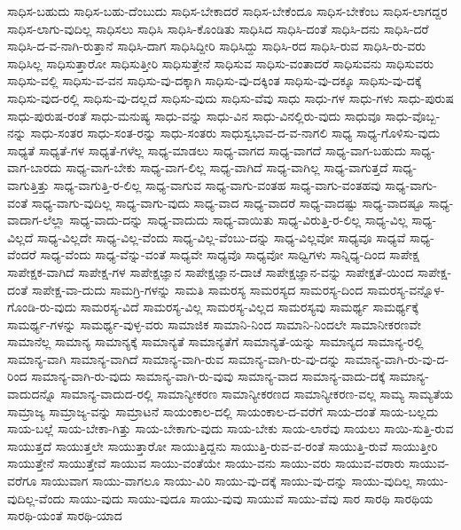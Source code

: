 {ಸಾಧಿಸ-ಬಹುದು
ಸಾಧಿಸ-ಬಹು-ದೆಂಬುದು
ಸಾಧಿಸ-ಬೇಕಾದರೆ
ಸಾಧಿಸ-ಬೇಕೆಂದೂ
ಸಾಧಿಸ-ಬೇಕೆಂಬ
ಸಾಧಿಸ-ಲಾಗದ್ದರ
ಸಾಧಿಸ-ಲಾಗು-ವುದಿಲ್ಲ
ಸಾಧಿಸಲು
ಸಾಧಿಸಿ
ಸಾಧಿಸಿ-ಕೊಂಡಿತು
ಸಾಧಿಸಿದ
ಸಾಧಿಸಿ-ದಂತೆ
ಸಾಧಿಸಿ-ದನು
ಸಾಧಿಸಿ-ದರೆ
ಸಾಧಿಸಿ-ದ-ವ-ನಾಗಿ-ರುತ್ತಾನೆ
ಸಾಧಿಸಿ-ದಾಗ
ಸಾಧಿಸಿದ್ದೀರಿ
ಸಾಧಿಸಿದ್ದು
ಸಾಧಿಸಿ-ರದ
ಸಾಧಿಸಿ-ರುವ
ಸಾಧಿಸಿ-ರು-ವರು
ಸಾಧಿಸಿಲ್ಲ
ಸಾಧಿಸುತ್ತಾರೋ
ಸಾಧಿಸುತ್ತೀರಿ
ಸಾಧಿಸುತ್ತೇನೆ
ಸಾಧಿಸುವ
ಸಾಧಿಸು-ವಂತಾದರೆ
ಸಾಧಿಸುವನು
ಸಾಧಿಸುವರು
ಸಾಧಿಸು-ವಲ್ಲಿ
ಸಾಧಿಸು-ವ-ವನ
ಸಾಧಿಸು-ವು-ದಕ್ಕಾಗಿ
ಸಾಧಿಸು-ವು-ದಕ್ಕಿಂತ
ಸಾಧಿಸು-ವು-ದಕ್ಕೂ
ಸಾಧಿಸು-ವು-ದಕ್ಕೆ
ಸಾಧಿಸು-ವುದ-ರಲ್ಲಿ
ಸಾಧಿಸು-ವು-ದಲ್ಲದೆ
ಸಾಧಿಸು-ವುದು
ಸಾಧಿಸು-ವೆವು
ಸಾಧು
ಸಾಧು-ಗಳ
ಸಾಧು-ಗಳು
ಸಾಧು-ಪುರುಷ
ಸಾಧು-ಪುರುಷ-ರಂತೆ
ಸಾಧು-ಮನುಷ್ಯ
ಸಾಧು-ವನ್ನು
ಸಾಧು-ವಿನ
ಸಾಧು-ವಿನಲ್ಲಿರು-ವುದು
ಸಾಧುವೂ
ಸಾಧು-ವೊಬ್ಬ-ನನ್ನು
ಸಾಧು-ಸಂತರ
ಸಾಧು-ಸಂತ-ರನ್ನು
ಸಾಧು-ಸಂತರು
ಸಾಧುಸ್ವಭಾವ-ದ-ವ-ನಾಗಲಿ
ಸಾಧ್ಯ
ಸಾಧ್ಯ-ಗೊಳಿಸು-ವುದು
ಸಾಧ್ಯತೆ
ಸಾಧ್ಯತೆ-ಗಳ
ಸಾಧ್ಯತೆ-ಗಳೆಲ್ಲ
ಸಾಧ್ಯ-ಮಾಡಲು
ಸಾಧ್ಯ-ವಾಗದ
ಸಾಧ್ಯ-ವಾಗದೆ
ಸಾಧ್ಯ-ವಾಗ-ಬಹುದು
ಸಾಧ್ಯ-ವಾಗ-ಬಾರದು
ಸಾಧ್ಯ-ವಾಗ-ಬೇಕು
ಸಾಧ್ಯ-ವಾಗ-ಲಿಲ್ಲ
ಸಾಧ್ಯ-ವಾಗಿದೆ
ಸಾಧ್ಯ-ವಾಗಿಲ್ಲ
ಸಾಧ್ಯ-ವಾಗುತ್ತದೆ
ಸಾಧ್ಯ-ವಾಗುತ್ತಿತ್ತು
ಸಾಧ್ಯ-ವಾಗುತ್ತಿ-ರ-ಲಿಲ್ಲ
ಸಾಧ್ಯ-ವಾಗುವ
ಸಾಧ್ಯ-ವಾಗು-ವಂತಹ
ಸಾಧ್ಯ-ವಾಗು-ವಂತಹವು
ಸಾಧ್ಯ-ವಾಗು-ವಂತೆ
ಸಾಧ್ಯ-ವಾಗು-ವುದಿಲ್ಲ
ಸಾಧ್ಯ-ವಾಗು-ವುದು
ಸಾಧ್ಯ-ವಾದ
ಸಾಧ್ಯ-ವಾದರೆ
ಸಾಧ್ಯ-ವಾದಷ್ಟು
ಸಾಧ್ಯ-ವಾದಷ್ಟೂ
ಸಾಧ್ಯ-ವಾದಾಗ-ಲೆಲ್ಲಾ
ಸಾಧ್ಯ-ವಾದು-ದನ್ನು
ಸಾಧ್ಯ-ವಾದುದು
ಸಾಧ್ಯ-ವಾಯಿತು
ಸಾಧ್ಯ-ವಿರುತ್ತಿ-ರ-ಲಿಲ್ಲ
ಸಾಧ್ಯ-ವಿಲ್ಲ
ಸಾಧ್ಯ-ವಿಲ್ಲದೆ
ಸಾಧ್ಯ-ವಿಲ್ಲದೇ
ಸಾಧ್ಯ-ವಿಲ್ಲ-ವೆಂದು
ಸಾಧ್ಯ-ವಿಲ್ಲ-ವೆಂಬು-ದನ್ನು
ಸಾಧ್ಯ-ವಿಲ್ಲವೋ
ಸಾಧ್ಯವೂ
ಸಾಧ್ಯವೆ
ಸಾಧ್ಯ-ವೆಂದರೆ
ಸಾಧ್ಯ-ವೆಂದು
ಸಾಧ್ಯ-ವೆನ್ನು-ವಂತೆ
ಸಾಧ್ಯವೇ
ಸಾಧ್ಯವೊ
ಸಾಧ್ಯವೋ
ಸಾಧ್ವಿಗಳು
ಸಾನ್ನಿಧ್ಯ-ದಿಂದ
ಸಾಪೇಕ್ಷ
ಸಾಪೇಕ್ಷಕ-ವಾಗಿದೆ
ಸಾಪೇಕ್ಷ-ಗಳ
ಸಾಪೇಕ್ಷಜ್ಞಾನ
ಸಾಪೇಕ್ಷಜ್ಞಾನ-ದಾಚೆ
ಸಾಪೇಕ್ಷಜ್ಞಾನ-ವನ್ನು
ಸಾಪೇಕ್ಷತೆ-ಯಿಂದ
ಸಾಪೇಕ್ಷ-ದಂತೆ
ಸಾಪೇಕ್ಷ-ವಾ-ದುದು
ಸಾಮಗ್ರಿ-ಗಳನ್ನು
ಸಾಮತಿ
ಸಾಮರಸ್ಯ
ಸಾಮರಸ್ಯದ
ಸಾಮರಸ್ಯ-ದಿಂದ
ಸಾಮರಸ್ಯ-ವನ್ನೊಳ-ಗೊಂಡಿ-ರು-ವುದು
ಸಾಮರಸ್ಯ-ವಿದೆ
ಸಾಮರಸ್ಯ-ವಿಲ್ಲ
ಸಾಮರಸ್ಯ-ವಿಲ್ಲದ
ಸಾಮರಸ್ಯವು
ಸಾಮರ್ಥ್ಯ
ಸಾಮರ್ಥ್ಯಕ್ಕೆ
ಸಾಮರ್ಥ್ಯ-ಗಳನ್ನು
ಸಾಮರ್ಥ್ಯ-ವುಳ್ಳ-ವರು
ಸಾಮಾಜಿಕ
ಸಾಮಾನಿ-ನಿಂದ
ಸಾಮಾನಿ-ನಿಂದಲೇ
ಸಾಮಾನೀಕರಣವೇ
ಸಾಮಾನೆಲ್ಲ
ಸಾಮಾನ್ಯ
ಸಾಮಾನ್ಯಕ್ಕೆ
ಸಾಮಾನ್ಯತೆ
ಸಾಮಾನ್ಯತೆಗೆ
ಸಾಮಾನ್ಯತೆ-ಯನ್ನು
ಸಾಮಾನ್ಯದ
ಸಾಮಾನ್ಯ-ರಲ್ಲಿ
ಸಾಮಾನ್ಯ-ವಾಗಿ
ಸಾಮಾನ್ಯ-ವಾಗಿದೆ
ಸಾಮಾನ್ಯ-ವಾಗಿ-ರುವ
ಸಾಮಾನ್ಯ-ವಾಗಿ-ರು-ವು-ದನ್ನು
ಸಾಮಾನ್ಯ-ವಾಗಿ-ರು-ವು-ದ-ರಿಂದ
ಸಾಮಾನ್ಯ-ವಾಗಿ-ರು-ವುದು
ಸಾಮಾನ್ಯ-ವಾಗಿ-ರು-ವುವು
ಸಾಮಾನ್ಯ-ವಾದ
ಸಾಮಾನ್ಯ-ವಾದು-ದಕ್ಕೆ
ಸಾಮಾನ್ಯ-ವಾದುದನ್ನೊ
ಸಾಮಾನ್ಯ-ವಾದುದ-ರಲ್ಲಿ
ಸಾಮಾನ್ಯೀಕರಣ
ಸಾಮಾನ್ಯೀಕರಣದ
ಸಾಮಾನ್ಯೀಕರಣ-ವಲ್ಲ
ಸಾಮ್ಯ
ಸಾಮ್ಯತೆಯ
ಸಾಮ್ರಾಜ್ಯ
ಸಾಮ್ರಾಜ್ಯ-ವನ್ನು
ಸಾಮ್ರಾಟನೆ
ಸಾಯಂಕಾಲ-ದಲ್ಲಿ
ಸಾಯಂಕಾಲ-ದ-ವರೆಗೆ
ಸಾಯ-ದಂತೆ
ಸಾಯ-ಬಲ್ಲದು
ಸಾಯ-ಬಲ್ಲೆ
ಸಾಯ-ಬೇಕಾ-ಗಿತ್ತು
ಸಾಯ-ಬೇಕಾಗು-ವುದು
ಸಾಯ-ಬೇಕು
ಸಾಯ-ಲಾರೆವು
ಸಾಯಲು
ಸಾಯಿ-ಸುತ್ತಿ-ರುವ
ಸಾಯುತ್ತದೆ
ಸಾಯುತ್ತಲೇ
ಸಾಯುತ್ತಾರೋ
ಸಾಯುತ್ತಿದ್ದನು
ಸಾಯುತ್ತಿ-ರುವ-ವ-ರಂತೆ
ಸಾಯುತ್ತಿ-ರುವೆ
ಸಾಯುತ್ತೀರಿ
ಸಾಯುತ್ತೇನೆ
ಸಾಯುತ್ತೇವೆ
ಸಾಯುವ
ಸಾಯು-ವಂತೆಯೇ
ಸಾಯು-ವನು
ಸಾಯು-ವರು
ಸಾಯುವ-ವರಾರು
ಸಾಯುವ-ವರೆಗೂ
ಸಾಯುವಾಗ
ಸಾಯು-ವಾಗಲೂ
ಸಾಯು-ವಿರಿ
ಸಾಯು-ವು-ದಕ್ಕೆ
ಸಾಯು-ವು-ದನ್ನು
ಸಾಯು-ವುದಿಲ್ಲ
ಸಾಯು-ವುದಿಲ್ಲ-ವೆಂದು
ಸಾಯು-ವುದು
ಸಾಯು-ವುದೂ
ಸಾಯು-ವುವು
ಸಾಯುವೆ
ಸಾಯು-ವೆವು
ಸಾರ
ಸಾರಥಿ
ಸಾರಥಿಯ
ಸಾರಥಿ-ಯಂತೆ
ಸಾರಥಿ-ಯಾದ
}
